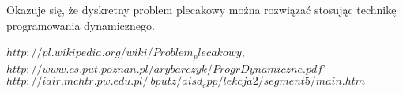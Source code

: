 \documentclass[11pt]{article}
\begin{document}
Okazuje się, że dyskretny problem plecakowy można rozwiązać stosując technikę
programowania dynamicznego.
\begin{thebibliography}{99}
\emph{$ http://pl.wikipedia.org/wiki/Problem_plecakowy$,}
\emph{$http://www.cs.put.poznan.pl/arybarczyk/ProgrDynamiczne.pdf$}'
\emph{$http://iair.mchtr.pw.edu.pl/~bputz/aisd_cpp/lekcja2/segment5/main.htm$}

\end{thebibliography}
\end{document}
